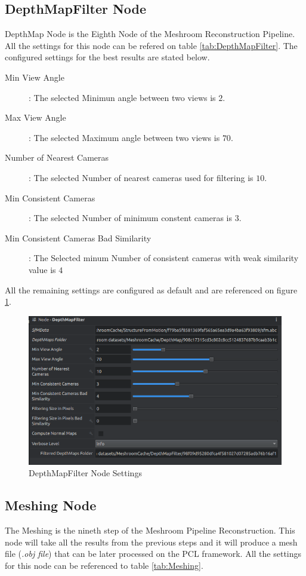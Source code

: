 \documentclass[12pt]{report}
\begin{document}
\subsection*{DepthMapFilter Node}
DepthMap Node is the Eighth Node of the Meshroom Reconstruction Pipeline. All the settings for this node can be refered on table \ref{tab:DepthMapFilter}.
The configured settings for the best results are stated below.

\begin{description}
  \item[Min View Angle]: The selected Minimun angle between two views is $2$.
  \item[Max View Angle]: The selected Maximum angle between two views is $70$.
  \item[Number of Nearest Cameras]: The selected Number of nearest cameras used for filtering is $10$.
  \item[Min Consistent Cameras]: The selected Number of minimum constent cameras is $3$.
  \item[Min Consistent Cameras Bad Similarity] : The Selected minum Number of consistent cameras with weak similarity value is $4$   
\end{description}
All the remaining settings are configured as default and are referenced on figure \ref{fig:DepthMapFilter}.

\begin{figure}[H]%
  \centering
 \includegraphics[width=1\textwidth]{DepthMapFilter.png}
\caption{DepthMapFilter Node Settings}
\label{fig:DepthMapFilter} 
\end{figure}

\subsection*{Meshing Node}
The Meshing is the nineth step of the Meshroom Pipeline Reconstruction. This node will take all the results from the previous steps
and it will produce a mesh file (\textit{.obj file}) that can be later processed on the PCL framework. 
All the settings for this node can be referenced to table \ref{tab:Meshing}.
\end{document}

